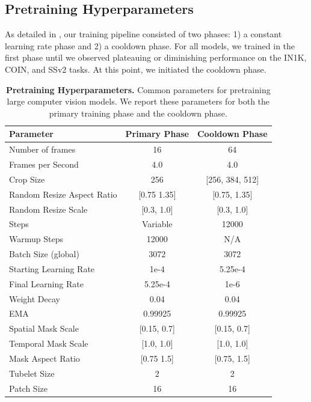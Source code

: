 \documentclass[]{kling/kling}
\begin{document}
\subsection{Pretraining Hyperparameters}
As detailed in , our training pipeline consisted of two phases: 1) a constant learning rate phase and 2) a cooldown phase.
For all models, we trained in the first phase until we observed plateauing or diminishing performance on the IN1K, COIN, and SSv2 tasks. At this point, we initiated the cooldown phase.
\begin{table}[h]
    \small
    \caption{\small{\bf Pretraining Hyperparameters.} Common parameters for pretraining large computer vision models. We report these parameters for both the primary training phase and the cooldown phase.}
    \centering
    \label{tab:pretraining_params}
    \begin{tabular}{l c c}
      \bf Parameter & \bf Primary Phase & \bf Cooldown Phase \\
        \toprule
        Number of frames & 16 & 64 \\
        Frames per Second & 4.0 & 4.0 \\
        Crop Size & 256 & [256, 384, 512] \\
        Random Resize Aspect Ratio & [0.75 1.35] & [0.75, 1.35] \\
        Random Resize Scale & [0.3, 1.0] & [0.3, 1.0] \\
        Steps & Variable & 12000 \\
        Warmup Steps & 12000 & N/A \\
        Batch Size (global) & 3072 & 3072 \\
        Starting Learning Rate & 1e-4 & 5.25e-4 \\
        Final Learning Rate & 5.25e-4 & 1e-6  \\
        Weight Decay & 0.04 & 0.04 \\
        EMA & 0.99925 & 0.99925 \\
        Spatial Mask Scale & [0.15, 0.7] & [0.15, 0.7] \\
        Temporal Mask Scale & [1.0, 1.0] & [1.0, 1.0] \\
        Mask Aspect Ratio & [0.75 1.5] & [0.75, 1.5] \\
        Tubelet Size & 2 & 2 \\
        Patch Size & 16 & 16 \\
        \bottomrule
    \end{tabular}
\end{table}
\end{document}

